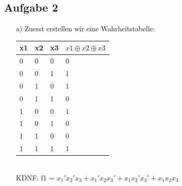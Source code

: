 \documentclass{scrartcl}
\begin{document}
	\subsection*{Aufgabe 2}
	\begin{itemize}
		\item[a)] Zuerst erstellen wir eine Wahrheitstabelle:\\
		\begin{table}[h]
			\begin{tabular}{l|l|l|l}
				x1 & x2 & x3 & $x1\oplus x2\oplus x3$ \\ \hline
				0  & 0  & 0  & 0 \\
				0  & 0  & 1  & 1 \\
				0  & 1  & 0  & 1 \\
				0  & 1  & 1  & 0 \\
				1  & 0  & 0  & 1 \\
				1  & 0  & 1  & 0 \\
				1  & 1  & 0  & 0 \\
				1  & 1  & 1  & 1 \hfill
			\end{tabular}
		\end{table}\\
		KDNF: f1 = $x_{1}'x_{2}'x_{3} + x_{1}'x_{2}x_{3}' + x_{1}x_{2}'x_{3}' + x_{1}x_{2}x_{3}$


\end{itemize}
\end{document}
